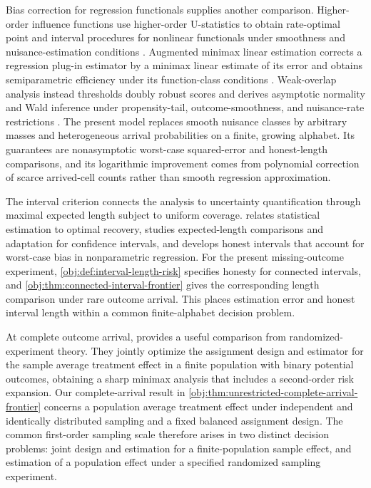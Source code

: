 Bias correction for regression functionals supplies another comparison. Higher-order influence functions use higher-order U-statistics to obtain rate-optimal point and interval procedures for nonlinear functionals under smoothness and nuisance-estimation conditions \citep{RobinsLiTchetgenVanderVaart2008,Robins2009}. Augmented minimax linear estimation corrects a regression plug-in estimator by a minimax linear estimate of its error and obtains semiparametric efficiency under its function-class conditions \citep{Hirshberg2021}. Weak-overlap analysis instead thresholds doubly robust scores and derives asymptotic normality and Wald inference under propensity-tail, outcome-smoothness, and nuisance-rate restrictions \citep{Dorn2025}. The present model replaces smooth nuisance classes by arbitrary masses and heterogeneous arrival probabilities on a finite, growing alphabet. Its guarantees are nonasymptotic worst-case squared-error and honest-length comparisons, and its logarithmic improvement comes from polynomial correction of scarce arrived-cell counts rather than smooth regression approximation.

The interval criterion connects the analysis to uncertainty quantification through maximal expected length subject to uniform coverage. \citet{Donoho1994} relates statistical estimation to optimal recovery, \citet{Cai2004} studies expected-length comparisons and adaptation for confidence intervals, and \citet{ArmstrongKolesar2020} develops honest intervals that account for worst-case bias in nonparametric regression. For the present missing-outcome experiment, \cref{obj:def:interval-length-risk} specifies honesty for connected intervals, and \cref{obj:thm:connected-interval-frontier} gives the corresponding length comparison under rare outcome arrival. This places estimation error and honest interval length within a common finite-alphabet decision problem.

At complete outcome arrival, \citet{Sudijono2026} provides a useful comparison from randomized-experiment theory. They jointly optimize the assignment design and estimator for the sample average treatment effect in a finite population with binary potential outcomes, obtaining a sharp minimax analysis that includes a second-order risk expansion. Our complete-arrival result in \cref{obj:thm:unrestricted-complete-arrival-frontier} concerns a population average treatment effect under independent and identically distributed sampling and a fixed balanced assignment design. The common first-order sampling scale therefore arises in two distinct decision problems: joint design and estimation for a finite-population sample effect, and estimation of a population effect under a specified randomized sampling experiment.
